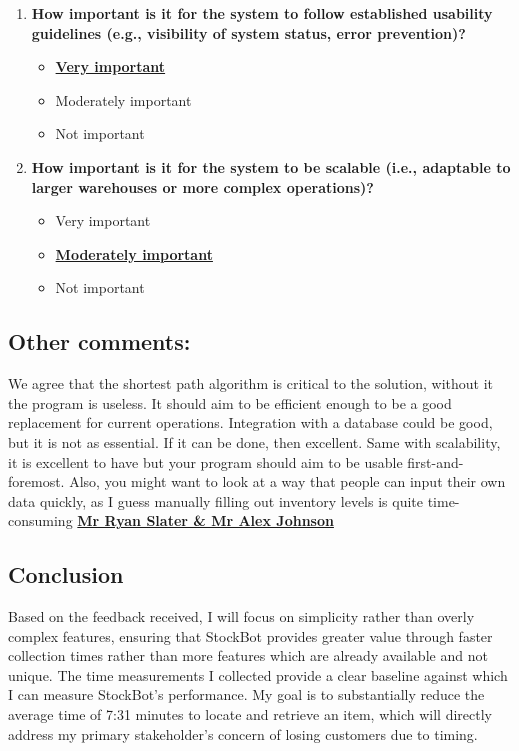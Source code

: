 \begin{enumerate}
    \item \textbf{How important is it for the system to follow established usability guidelines (e.g., visibility of system status, error prevention)?}
    \begin{itemize}
        \item \textbf{\underline{Very important}}
        \item Moderately important
        \item Not important
    \end{itemize}

    \item \textbf{How important is it for the system to be scalable (i.e., adaptable to larger warehouses or more complex operations)?}
    \begin{itemize}
        \item Very important
        \item \textbf{\underline{Moderately important}}
        \item Not important
    \end{itemize}
\end{enumerate}

\subsection*{Other comments:}

We agree that the shortest path algorithm is critical to the solution, without it the program is useless. It should aim to be efficient enough to be a good replacement for current operations. Integration with a database could be good, but it is not as essential. If it can be done, then excellent. Same with scalability, it is excellent to have but your program should aim to be usable first-and-foremost. Also, you might want to look at a way that people can input their own data quickly, as I guess manually filling out inventory levels is quite time-consuming
\vspace{0.7cm}
\newline
\textbf{\underline{Mr Ryan Slater \& Mr Alex Johnson}} \newline


\subsection{Conclusion}

Based on the feedback received, I will focus on simplicity rather than overly complex features, ensuring that StockBot provides greater value through faster collection times rather than more features which are already available and not unique. The time measurements I collected provide a clear baseline against which I can measure StockBot's performance. My goal is to substantially reduce the average time of 7:31 minutes to locate and retrieve an item, which will directly address my primary stakeholder's concern of losing customers due to timing.

